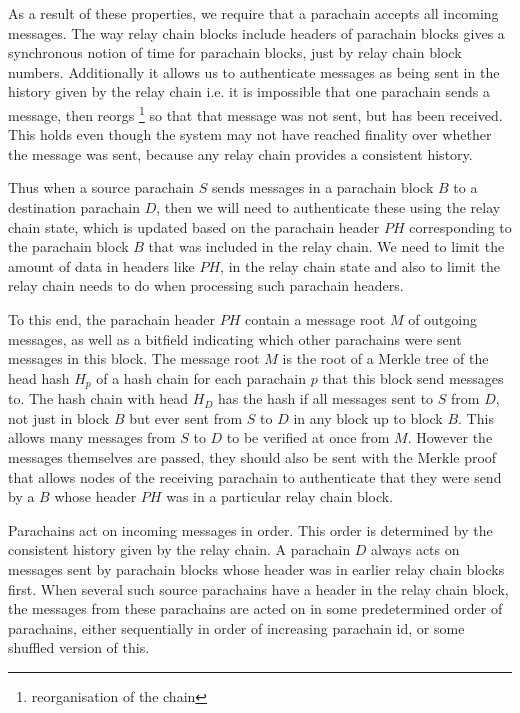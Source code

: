As a result of these properties, we require that a parachain accepts all incoming messages.
The way relay chain blocks include headers of parachain blocks gives a synchronous notion of time for parachain blocks, just by relay chain block numbers. Additionally it allows us to authenticate messages as being sent in the history given by the relay chain i.e. it is impossible that one parachain sends a message, then reorgs \footnote{reorganisation of the chain} so that that message was not sent, but has been received. This holds even though the system may not have reached finality over whether the message was sent, because any relay chain provides a consistent history.


Thus when a source parachain $S$ sends messages in a parachain block $B$ to a destination parachain $D$, then we will need to authenticate these using the relay chain state, which is updated based on the parachain header $PH$ corresponding to the parachain block $B$ that was included in the relay chain. We need to limit the amount of data in headers like $PH$, in the relay chain state and also to limit the relay chain needs to do when processing such parachain headers.

To this end, the parachain header $PH$ contain a message root $M$ of outgoing messages, as well as a bitfield indicating which other parachains were sent messages in this block.
The message root $M$ is the root of a Merkle tree of the head hash $H_p$ of a hash chain for each parachain $p$ that this block send messages to.  The hash chain with head $H_D$ has the hash if all messages sent to $S$ from $D$, not just in block $B$ but ever sent from $S$ to $D$ in any block up to block $B$. This allows many messages from $S$ to $D$  to be verified at once from $M$. However the messages themselves are passed, they should also be sent with the Merkle proof that allows nodes of the receiving parachain
to authenticate that they were send by a $B$ whose header  $PH$ was in a particular relay chain block.

Parachains act on incoming messages in order. This order is determined by the consistent history given by the relay chain.  A parachain $D$ always acts on messages sent by parachain blocks whose header was in earlier relay chain blocks first. When several such source parachains have a header in the relay chain block, the messages from these parachains are acted on in some predetermined order of parachains, either sequentially in order of increasing parachain id, or some shuffled version of this.


